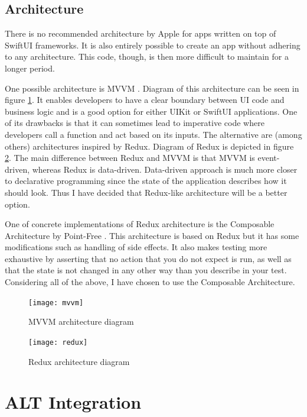 \subsection{Architecture}

There is no recommended architecture by Apple for apps written on top of SwiftUI frameworks. It is also entirely possible to create an app without adhering to any architecture. This code, though, is then more difficult to maintain for a longer period.

One possible architecture is MVVM \cite{mvvm}. Diagram of this architecture can be seen in figure \ref{mvvm}. It enables developers to have a clear boundary between UI code and business logic and is a good option for either UIKit or SwiftUI applications. One of its drawbacks is that it can sometimes lead to imperative code where developers call a function and act based on its inputs. The alternative are (among others) architectures inspired by Redux. Diagram of Redux is depicted in figure \ref{redux}. The main difference between Redux and MVVM is that MVVM is event-driven, whereas Redux is data-driven. Data-driven approach is much more closer to declarative programming since the state of the application describes how it should look. Thus I have decided that Redux-like architecture will be a better option.

One of concrete implementations of Redux architecture is the Composable Architecture by Point-Free \cite{tca}. This architecture is based on Redux but it has some modifications such as handling of side effects. It also makes testing more exhaustive by asserting that no action that you do not expect is run, as well as that the state is not changed in any other way than you describe in your test. Considering all of the above, I have chosen to use the Composable Architecture. 

\begin{figure}
    \texttt{[image: mvvm]}
    \caption{MVVM architecture diagram \cite{mvvm}}\label{mvvm}
\end{figure}

\begin{figure}
    \texttt{[image: redux]}
    \caption{Redux architecture diagram \cite{react-redux}}\label{redux}
\end{figure}

\section{ALT Integration}

